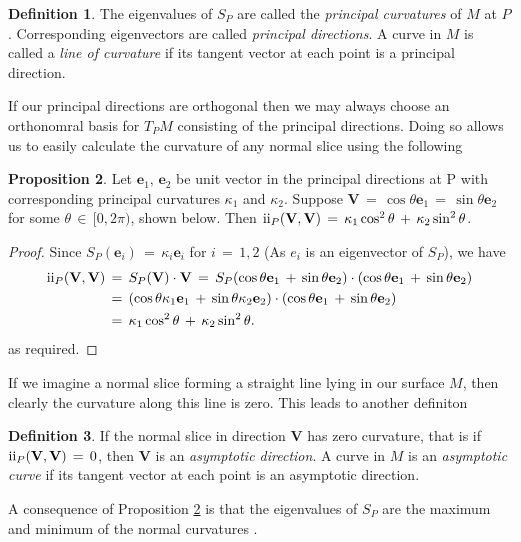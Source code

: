 \documentclass{UKZNcomp}
\newcommand{\vect}[1]{\mathbf{#1}} %
\newcommand{\RN}[1]{%
  \textup{\uppercase\expandafter{\romannumeral#1}}%
}
\theoremstyle{definition}
\newtheorem{definition}{Definition}[section]
\newtheorem{prop}[definition]{Proposition}
\theoremstyle{remark}
\begin{document}
\begin{definition}
The eigenvalues of $S_P$ are called the \textit{principal curvatures} of $M$ at $P$. Corresponding eigenvectors are called \textit{principal directions}. A curve in $M$ is called a \textit{line of curvature} if its tangent vector at each point is a principal direction. 
\end{definition}
If our principal directions are orthogonal then we may always choose an orthonomral basis for $T_PM$ consisting of the principal directions. Doing so allows us to easily calculate the curvature of any normal slice using the following

\begin{prop}\label{prop:407}
Let $\vect e_1,\, \vect e_2$ be unit vector in the principal directions at P with corresponding principal curvatures $\kappa_1$ and $\kappa_2$. Suppose $\vect V\,=\,\cos\theta\vect e_1\,=\,\sin\theta\vect e_2$ for some $\theta \,\in\,[0,2\pi)$, shown below. Then $\RN{2}_P(\vect V, \vect V)\,=\,\kappa_1\cos^2\theta \,+\,\kappa_2\sin^2\theta$.
\end{prop}
\begin{proof}
Since $S_P(\vect e_i)\,=\,\kappa_i\vect e_i$ for $i\,=\,1,2$ (As $e_i$ is an eigenvector of $S_P$), we have
\begin{align*}
\RN{2}_P(\vect V, \vect V)\,&=\,S_P(\vect V)\cdot\vect V\,=\,S_P(\cos\theta\vect e_1\,+\,\sin\theta\vect e_2)\cdot(\cos\theta\vect e_1\,+\,\sin\theta\vect e_2)\\
&=\,(\cos\theta \kappa_1\vect e_1\,+\,\sin\theta \kappa_2\vect e_2)\cdot(\cos\theta\vect e_1\,+\,\sin\theta\vect e_2)\\
&=\,\kappa_1\cos^2\theta\,+\,\kappa_2\sin^2\theta.
\end{align*}
as required.
\end{proof}

If we imagine a normal slice forming a straight line lying in our surface $M$, then clearly the curvature along this line is zero. This leads to another definiton

\begin{definition}
If the normal slice in direction $\vect V$ has zero curvature, that is if $\RN{2}_P(\vect V, \vect V)\,=\,0$, then $\vect V$ is an \textit{asymptotic direction}. A curve in $M$ is an \textit{asymptotic curve} if its tangent vector at each point is an asymptotic direction.
\end{definition}

A consequence of Proposition \ref{prop:407} is that the eigenvalues of $S_P$ are the maximum and minimum of the normal curvatures \cite{Shifrin2016}.
\end{document}
